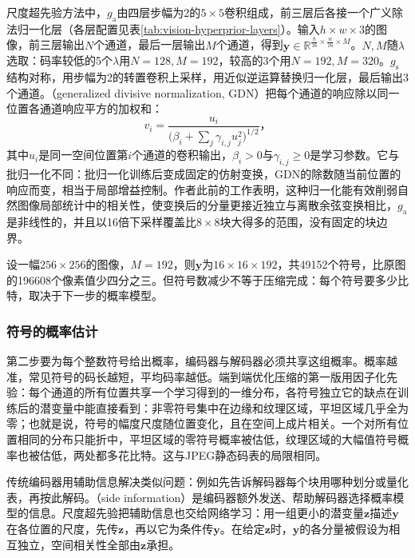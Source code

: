 尺度超先验方法中，$g_{\mathrm{a}}$由四层步幅为2的$5\times5$卷积组成，前三层后各接一个广义除法归一化层（各层配置见表\ref{tab:vision-hyperprior-layers}）。输入$h\times w\times3$的图像，前三层输出$N$个通道，最后一层输出$M$个通道，得到$\bm{y}\in\mathbb{R}^{\frac{h}{16}\times\frac{w}{16}\times M}$。$N,M$随$\lambda$选取：码率较低的5个$\lambda$用$N=128,M=192$，较高的3个用$N=192,M=320$。$g_{\mathrm{s}}$结构对称，用步幅为2的转置卷积上采样，用近似逆运算替换归一化层，最后输出3个通道。（generalized divisive normalization, GDN）把每个通道的响应除以同一位置各通道响应平方的加权和：
\begin{equation}
 v_i=\frac{u_i}{\bigl(\beta_i+\sum_j\gamma_{i,j}u_j^2\bigr)^{1/2}}\text{，}
 \label{eq:vision-gdn}
\end{equation}
其中$u_i$是同一空间位置第$i$个通道的卷积输出，$\beta_i>0$与$\gamma_{i,j}\geq0$是学习参数。它与批归一化不同：批归一化训练后变成固定的仿射变换，GDN的除数随当前位置的响应而变，相当于局部增益控制。作者此前的工作表明，这种归一化能有效削弱自然图像局部统计中的相关性，使变换后的分量更接近独立与离散余弦变换相比，$g_{\mathrm{a}}$是非线性的，并且以16倍下采样覆盖比$8\times8$块大得多的范围，没有固定的块边界。

设一幅$256\times256$的图像，$M=192$，则$\bm{y}$为$16\times16\times192$，共49152个符号，比原图的196608个像素值少四分之三。但符号数减少不等于压缩完成：每个符号要多少比特，取决于下一步的概率模型。

\subsubsection{符号的概率估计}
\label{sec:vision-restoration-bitstream}
\label{sec:vision-restoration-hyperprior}

第二步要为每个整数符号给出概率，编码器与解码器必须共享这组概率。概率越准，常见符号的码长越短，平均码率越低。端到端优化压缩的第一版用因子化先验：每个通道的所有位置共享一个学习得到的一维分布，各符号独立它的缺点在训练后的潜变量中能直接看到：非零符号集中在边缘和纹理区域，平坦区域几乎全为零；也就是说，符号的幅度尺度随位置变化，且在空间上成片相关。一个对所有位置相同的分布只能折中，平坦区域的零符号概率被估低，纹理区域的大幅值符号概率也被估低，两处都多花比特。这与JPEG静态码表的局限相同。

传统编码器用辅助信息解决类似问题：例如先告诉解码器每个块用哪种划分或量化表，再按此解码。（side information）是编码器额外发送、帮助解码器选择概率模型的信息。尺度超先验把辅助信息也交给网络学习：用一组更小的潜变量$\bm{z}$描述$\bm{y}$在各位置的尺度，先传$\bm{z}$，再以它为条件传$\bm{y}$。在给定$\bm{z}$时，$\bm{y}$的各分量被假设为相互独立，空间相关性全部由$\bm{z}$承担。

